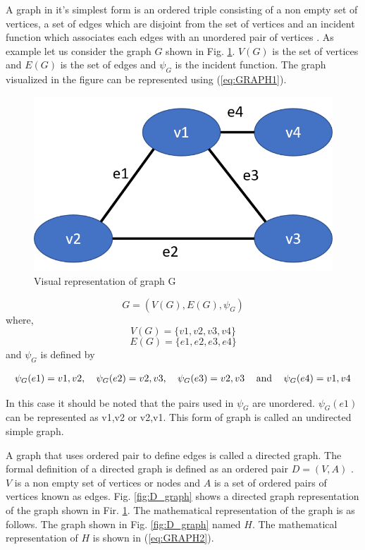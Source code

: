 A graph in it's simplest form is an ordered triple consisting of a non empty set of vertices, a set of edges which are disjoint from the set of vertices and an incident function which associates each edges with an unordered pair of vertices \cite{bondy1976graph}. As example let us consider the graph $G$ shown in Fig. \ref{fig:Simple_graph}. $V(G)$ is the set of vertices and $E(G)$ is the set of edges and $\psi_G$ is the incident function. The graph visualized in the figure can be represented using (\ref{eq:GRAPH1}).\\

\begin{figure}[!htb]
\centering
\includegraphics[width=0.5\linewidth]{figs/A8/Simple_graph.png}
\caption{Visual representation of graph G}
\label{fig:Simple_graph}
\vspace{-3mm}
\end{figure}

\begin{equation}
\label{eq:GRAPH1}
   G = (V(G), E(G), \psi_G)
\end{equation}
where,
$$
V(G) = \{v1,v2,v3,v4\} 
$$
$$
E(G) = \{e1, e2, e3, e4\}
$$
and $\psi_G$ is defined by 

\begin{equation*}
\begin{tabular}{lllll}
$\psi_G(e1) = v1,v2$, &$\psi_G(e2) = v2,v3$,  &$\psi_G(e3) = v2,v3$ & and & $\psi_G(e4) = v1,v4$
\end{tabular}
\end{equation*}

In this case it should be noted that the pairs used in $\psi_G$ are unordered. $\psi_G(e1)$ can be represented as v1,v2 or v2,v1. This form of graph is called an undirected simple graph. 

A graph that uses ordered pair to define edges is called a directed graph. The formal definition of a directed graph is defined as an ordered pair $D = (V,A)$ \cite{bang2008digraphs}. $V$ is a non empty set of vertices or nodes and $A$ is a set of ordered pairs of vertices known as edges. Fig. \ref{fig:D_graph} shows a directed graph representation of the graph shown in Fir. \ref{fig:Simple_graph}. The mathematical representation of the graph is as follows. The graph shown in Fig. \ref{fig:D_graph} named $H$. The mathematical representation of $H$ is shown in (\ref{eq:GRAPH2}).

